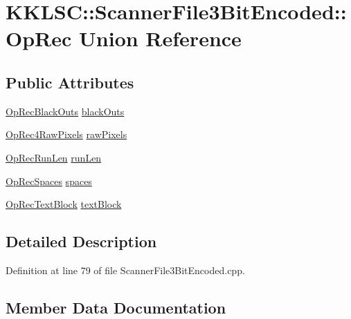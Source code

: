 \hypertarget{union_scanner_file3_bit_encoded_1_1_op_rec}{}\section{K\+K\+L\+SC\+:\+:Scanner\+File3\+Bit\+Encoded\+:\+:Op\+Rec Union Reference}
\label{union_scanner_file3_bit_encoded_1_1_op_rec}
\subsection*{Public Attributes}
\begin{DoxyCompactItemize}
\item 
\hyperlink{struct_scanner_file3_bit_encoded_1_1_op_rec_black_outs}{Op\+Rec\+Black\+Outs} \hyperlink{union_scanner_file3_bit_encoded_1_1_op_rec_af0dcad1efdef80164a6e6fdc6f7221be}{black\+Outs}
\item 
\hyperlink{struct_scanner_file3_bit_encoded_1_1_op_rec4_raw_pixels}{Op\+Rec4\+Raw\+Pixels} \hyperlink{union_scanner_file3_bit_encoded_1_1_op_rec_ae21499d7ed7e38c37950580dbaef5fc0}{raw\+Pixels}
\item 
\hyperlink{struct_scanner_file3_bit_encoded_1_1_op_rec_run_len}{Op\+Rec\+Run\+Len} \hyperlink{union_scanner_file3_bit_encoded_1_1_op_rec_a3fbb440291b85aaf74bcf437735ec83e}{run\+Len}
\item 
\hyperlink{struct_scanner_file3_bit_encoded_1_1_op_rec_spaces}{Op\+Rec\+Spaces} \hyperlink{union_scanner_file3_bit_encoded_1_1_op_rec_a84dd30292d5a11eed9d174961ab5b778}{spaces}
\item 
\hyperlink{struct_scanner_file3_bit_encoded_1_1_op_rec_text_block}{Op\+Rec\+Text\+Block} \hyperlink{union_scanner_file3_bit_encoded_1_1_op_rec_a824f04c1d867a28893b35c5cd72a466d}{text\+Block}
\end{DoxyCompactItemize}


\subsection{Detailed Description}


Definition at line 79 of file Scanner\+File3\+Bit\+Encoded.\+cpp.



\subsection{Member Data Documentation}
